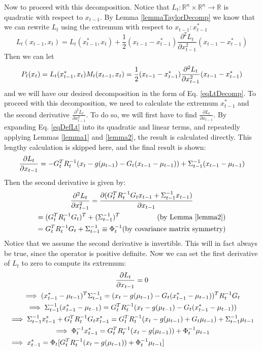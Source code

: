 Now to proceed with this decomposition. Notice that \(L_t : \mathbb{R}^n \times \mathbb{R}^n \to \mathbb{R}\) is quadratic with respect to \(x_{t-1}\). By Lemma \ref{lemmaTaylorDecomp} we know that we can rewrite \(L_t\) using the extremum with respect to \(x_{t-1}: x_{t-1}^*\)
\begin{equation} \label{eqLtDecompUsingLemma}
L_t(x_{t-1},x_t) = L_t(x_{t-1}^*,x_t) + \frac{1}{2} (x_{t-1} - x_{t-1}^*) \frac{\partial^2 L_t}{\partial x_{t-1}^2} (x_{t-1} - x_{t-1}^*)
\end{equation}
Then we can let \[
P_t(x_t) = L_t(x_{t-1}^*,x_t) \\ M_t(x_{t-1},x_t) = \frac{1}{2} (x_{t-1} - x_{t-1}^*) \frac{\partial^2 L_t}{\partial x_{t-1}^2} (x_{t-1} - x_{t-1}^*)
\]
and we will have our desired decomposition in the form of Eq. \ref{eqLtDecomp}. To proceed with this decomposition, we need to calculate the extremum \(x_{t-1}^*\) and the second derivative \(\frac{\partial^2 L_t}{\partial x_{t-1}^2}\). To do so, we will first have to find \(\frac{\partial L_t}{\partial x_{t-1}}\). By expanding Eq. \ref{eqDefLt} into its quadratic and linear terms, and repeatedly applying Lemmas \ref{lemma1} and \ref{lemma2}, the result is calculated directly. This lengthy calculation is skipped here, and the final result is shown:
\begin{multline*}
\frac{\partial L_t}{\partial x_{t-1}} = -G_t^TR_t^{-1}(x_t - g(\mu_{t-1}) - G_t (x_{t-1} - \mu_{t-1})) + \Sigma_{t-1}^{-1}(x_{t-1} - \mu_{t-1}) \hfill
\end{multline*}
Then the second derivative is given by:
\begin{multline*}
\frac{\partial^2 L_t}{\partial x_{t-1}^2} = \frac{\partial (G_t^TR_t^{-1}G_tx_{t-1} + \Sigma_{t-1}^{-1}x_{t-1})}{\partial x_{t-1}} \\
= (G_t^TR_t^{-1}G_t)^T + (\Sigma_{t-1}^{-1})^T \hfill \text{(by Lemma \ref{lemma2})} \\
= G_t^TR_t^{-1}G_t + \Sigma_{t-1}^{-1} \equiv \Phi_t^{-1} \hfill \text{(by covariance matrix symmetry)}
\end{multline*}
Notice that we assume the second derivative is invertible. This will in fact always be true, since the operator is positive definite. Now we can set the first derivative of \(L_t\) to zero to compute its extremum:
\begin{multline}
\frac{\partial L_t}{\partial x_{t-1}} = 0 \\
\implies (x_{t-1}^* - \mu_{t-1})^T \Sigma_{t-1}^{-1} = (x_t - g(\mu_{t-1}) - G_t (x_{t-1}^* - \mu_{t-1}))^T R_t^{-1} G_t \\
\implies \Sigma_{t-1}^{-1} (x_{t-1}^* - \mu_{t-1}) = G_t^T R_t^{-1}  (x_t - g(\mu_{t-1}) - G_t (x_{t-1}^* - \mu_{t-1})) \\
\implies \Sigma_{t-1}^{-1} x_{t-1}^* + G_t^T R_t^{-1}G_t x_{t-1}^* = G_t^T R_t^{-1}  (x_t - g(\mu_{t-1}) + G_t \mu_{t-1}) + \Sigma_{t-1}^{-1} \mu_{t-1} \\
\implies \Phi_t^{-1} x_{t-1}^* = G_t^T R_t^{-1}  (x_t - g(\mu_{t-1})) + \Phi_t^{-1} \mu_{t-1} \\
\implies x_{t-1}^* = \Phi_t [G_t^T R_t^{-1}  (x_t - g(\mu_{t-1})) + \Phi_t^{-1} \mu_{t-1}] \hfill
\end{multline}
